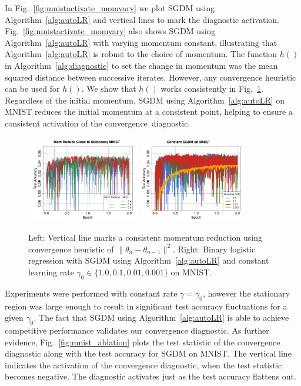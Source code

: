 \documentclass[conference]{IEEEtran}
\begin{document}
In Fig.~\ref{fig:mnistactivate_momvary} we plot SGDM using Algorithm~\ref{alg:autoLR} and vertical lines to mark the diagnostic activation.
Fig.~\ref{fig:mnistactivate_momvary} also shows SGDM using Algorithm~\ref{alg:autoLR} with varying momentum constant, illustrating that Algorithm~\ref{alg:autoLR} is robust to the choice of momentum.
The function $h()$  in Algorithm~\ref{alg:diagnostic} to set the change in momentum was the mean squared distance between successive iterates. 
However, any convergence heuristic can be used for $h()$.
We show that $h()$ works consistently in Fig.~\ref{fig:momred_constlr}.
Regardless of the initial momentum, SGDM using Algorithm~\ref{alg:autoLR} on MNIST reduces the initial momentum at a consistent point, helping to ensure a consistent activation of the convergence~diagnostic.
\begin{figure}[ht]
\mbox{\hspace{-0.1in}
  \includegraphics[width=1.85in]{fig/RFig4_CheckStat.pdf}\hspace{-0.12in}
\includegraphics[width=1.85in]{fig/RFig5_Const.pdf}
}
\vspace{-0.15in}
  \caption{Left: Vertical line marks a consistent momentum reduction using convergence heuristic of $\| \theta_n - \theta_{n-1} \|^2$.
  Right: Binary logistic regression with SGDM using Algorithm~\ref{alg:autoLR} and constant learning rate $\gamma_0 \in \{1.0, 0.1, 0.01, 0.001\}$ on MNIST.
  }
\label{fig:momred_constlr}%
\end{figure}


\vspace{0.05in}
Experiments were performed with constant rate $\gamma = \gamma_0$, however the stationary region was large enough to result in significant test accuracy fluctuations for a given $\gamma_0$. 
The fact that SGDM using Algorithm~\ref{alg:autoLR} is able to achieve competitive performance validates our convergence diagnostic. 
As further evidence, Fig.~\ref{fig:mnist_ablation} plots the test statistic of the convergence diagnostic along with the test accuracy for SGDM on MNIST.
The vertical line indicates the activation of the convergence diagnostic, when the test statistic becomes negative. 
The diagnostic activates just as the test accuracy flattens out.
\end{document}
